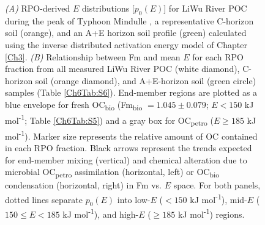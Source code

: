 \begin{figure}[p]
	\caption[RPO $p_{0}(E)$ distributions and $E$ vs. Fm plots]{\textit{(A)} RPO-derived $E$ distributions [$p_{0}(E)$] for LiWu River POC during the peak of Typhoon Mindulle \citep[white;][]{Hilton:2008fo}, a representative C-horizon soil (orange), and an A+E horizon soil profile (green) calculated using the inverse distributed activation energy model of Chapter \ref{Ch3}. \textit{(B)} Relationship between Fm and mean $E$ for each RPO fraction from all measured LiWu River POC (white diamond), C-horizon soil (orange diamond), and A+E-horizon soil (green circle) samples (Table \ref{Ch6Tab:S6}). End-member regions are plotted as a blue envelope for fresh OC\textsubscript{bio} (Fm\textsubscript{bio} $= 1.045 \pm 0.079$; $E < 150$ kJ mol\textsuperscript{-1}; Table \ref{Ch6Tab:S5}) and a gray box for OC\textsubscript{petro} ($E \geq 185$ kJ mol\textsuperscript{-1}). Marker size represents the relative amount of OC contained in each RPO fraction. Black arrows represent the trends expected for end-member mixing (vertical) and chemical alteration due to microbial OC\textsubscript{petro} assimilation (horizontal, left) or OC\textsubscript{bio} condensation (horizontal, right) in Fm vs. $E$ space. For both panels, dotted lines separate $p_{0}(E)$ into low-$E$ ($<150$ kJ mol\textsuperscript{-1}), mid-$E$ ($150 \leq E < 185$ kJ mol\textsuperscript{-1}), and high-$E$ ($\geq 185$ kJ mol\textsuperscript{-1}) regions.}
	\label{Ch6Fig:2} 
\end{figure}


